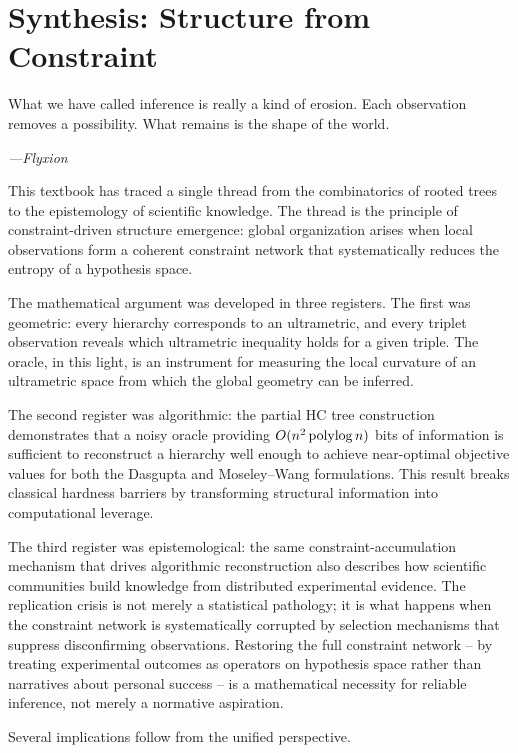 \chapter*{Synthesis: Structure from Constraint}

\epigraph{%
  What we have called inference is really a kind of erosion.
  Each observation removes a possibility.
  What remains is the shape of the world.%
}{\textit{---Flyxion}}

This textbook has traced a single thread from the combinatorics of rooted trees to the epistemology of scientific knowledge. The thread is the principle of constraint-driven structure emergence: global organization arises when local observations form a coherent constraint network that systematically reduces the entropy of a hypothesis space.

The mathematical argument was developed in three registers. The first was geometric: every hierarchy corresponds to an ultrametric, and every triplet observation reveals which ultrametric inequality holds for a given triple. The oracle, in this light, is an instrument for measuring the local curvature of an ultrametric space from which the global geometry can be inferred.

The second register was algorithmic: the partial HC tree construction demonstrates that a noisy oracle providing $O(n^2 \operatorname{polylog} n)$ bits of information is sufficient to reconstruct a hierarchy well enough to achieve near-optimal objective values for both the Dasgupta and Moseley--Wang formulations. This result breaks classical hardness barriers by transforming structural information into computational leverage.

The third register was epistemological: the same constraint-accumulation mechanism that drives algorithmic reconstruction also describes how scientific communities build knowledge from distributed experimental evidence. The replication crisis is not merely a statistical pathology; it is what happens when the constraint network is systematically corrupted by selection mechanisms that suppress disconfirming observations. Restoring the full constraint network -- by treating experimental outcomes as operators on hypothesis space rather than narratives about personal success -- is a mathematical necessity for reliable inference, not merely a normative aspiration.

Several implications follow from the unified perspective.

